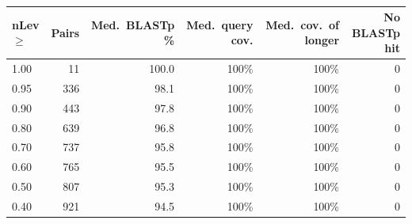 \begin{table}[htbp]
\centering
\caption{}
\label{tab:S6_reverse}
\begin{tabular}{lrrrrr}
\toprule
\textbf{nLev $\geq$} & \textbf{Pairs} & \textbf{Med.\ BLASTp \%} & \textbf{Med.\ query cov.} & \textbf{Med.\ cov.\ of longer} & \textbf{No BLASTp hit} \\
\midrule
1.00 & 11 & 100.0 & 100\% & 100\% & 0 \\
0.95 & 336 & 98.1 & 100\% & 100\% & 0 \\
0.90 & 443 & 97.8 & 100\% & 100\% & 0 \\
0.80 & 639 & 96.8 & 100\% & 100\% & 0 \\
0.70 & 737 & 95.8 & 100\% & 100\% & 0 \\
0.60 & 765 & 95.5 & 100\% & 100\% & 0 \\
0.50 & 807 & 95.3 & 100\% & 100\% & 0 \\
0.40 & 921 & 94.5 & 100\% & 100\% & 0 \\
\bottomrule
\end{tabular}
\end{table}
